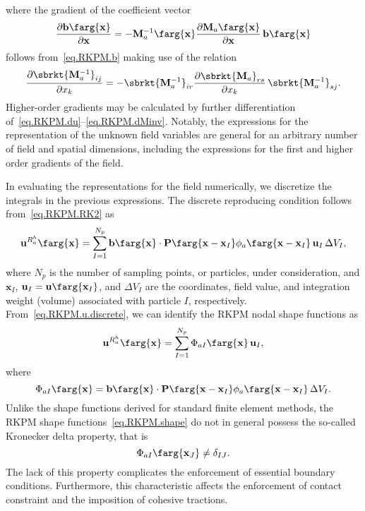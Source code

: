 where the gradient of the coefficient vector
\begin{equation}
\label{eq.RKPM.db}    
\frac{\partial \mathbf{b}\farg{\mathbf{x}}}{\partial \mathbf{x}}=
-\mathbf{M}_{a}^{-1}\farg{\mathbf{x}}
\frac{\partial \mathbf{M}_{a}\farg{\mathbf{x}}}{\partial \mathbf{x}}\,
\mathbf{b}\farg{\mathbf{x}}
\end{equation}
follows from~\eqref{eq.RKPM.b} making use of the relation
\begin{equation}
\label{eq.RKPM.dMinv}    
\frac{\partial \sbrkt{\mathbf{M}_{a}^{-1}}_{ij}}{\partial x_{k}}=
-\sbrkt{\mathbf{M}_{a}^{-1}}_{ir} 
\frac{\partial \sbrkt{\mathbf{M}_{a}}_{rs}}{\partial x_{k}}\,
\sbrkt{\mathbf{M}_{a}^{-1}}_{sj}.
\end{equation}    
Higher-order gradients may be calculated by further differentiation 
of~\eqref{eq.RKPM.du}--\eqref{eq.RKPM.dMinv}.
Notably, the expressions for the representation of the unknown field
variables are general for an arbitrary number of field and spatial
dimensions, including the expressions for the first and higher order
gradients of the field.

In evaluating the representations for the field numerically, we 
discretize the integrals in the previous expressions. The discrete reproducing 
condition follows from~\eqref{eq.RKPM.RK2} as
\begin{equation}
\label{eq.RKPM.u.discrete}    
\mathbf{u}^{R_{a}^{{h}}}\farg{\mathbf{x}}= \sum \limits_{I=1}^{N_{p}}
    \mathbf{b}\farg{\mathbf{x}}
    \cdot \mathbf{P}\farg{\mathbf{x}-\mathbf{x}_{I}} 
    \phi_{a}\farg{\mathbf{x}-\mathbf{x}_{I}}\,
    \mathbf{u}_{I}\,\Delta V_{I},
\end{equation}    
where $N_{p}$ is the number of sampling points, or particles, under 
consideration, and $\mathbf{x}_{I}$,
$\mathbf{u}_{I}=\mathbf{u}\farg{\mathbf{x}_{I}}$,
and $\Delta V_{I}$ are the coordinates, field value, and
integration weight (volume) associated with particle $I$,
respectively. 
From~\eqref{eq.RKPM.u.discrete}, we can identify the RKPM nodal 
shape functions as
\begin{equation}
\label{eq.RKPM.shape.expansion}    
\mathbf{u}^{R_{a}^{{h}}}\farg{\mathbf{x}}= \sum \limits_{I=1}^{N_{p}}
\Phi_{aI}\farg{\mathbf{x}}\,\mathbf{u}_{I},
\end{equation}    
where
\begin{equation}
\label{eq.RKPM.shape}    
\Phi_{aI}\farg{\mathbf{x}}=
    \mathbf{b}\farg{\mathbf{x}}
    \cdot \mathbf{P}\farg{\mathbf{x}-\mathbf{x}_{I}} 
    \phi_{a}\farg{\mathbf{x}-\mathbf{x}_{I}}\,\Delta V_{I}.
\end{equation}    
Unlike the shape functions derived for standard finite element methods,
the RKPM shape functions~\eqref{eq.RKPM.shape} do not in general possess the 
so-called Kronecker delta property, that is
\begin{equation}
\Phi_{aI}\farg{\mathbf{x}_{J}} \not = \delta_{IJ}.
\end{equation}
The lack of this property complicates the enforcement of essential 
boundary conditions. Furthermore, this characteristic affects the 
enforcement of contact constraint and the imposition of cohesive 
tractions.

